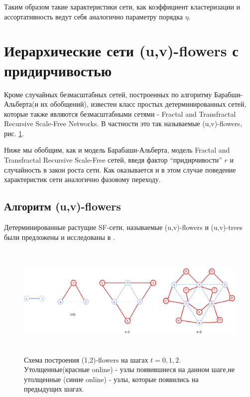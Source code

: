 \documentclass[10pt,aps,pra]{revtex4-1}
\begin{document}
        Таким образом такие характеристики сети, как коэффициент кластеризации и ассортативность ведут себя аналогично параметру порядка $\eta$.

\section{Иерархические сети (u,v)-flowers с придирчивостью}

    Кроме случайных безмасштабных сетей, построенных по алгоритму Барабши-Альберта(и их обобщений), известен класс простых детерминированных сетей, которые также являются безмасштабными сетями \cite{Rozenfeld2} - Fractal and Transfractal Recursive Scale-Free Networks. В частности это так называемые (u,v)-flowers, рис. \ref{fig:flowerGraph}.

    Ниже мы обобщим, как и модель Барабаши-Альберта, модель Fractal and Transfractal Recursive Scale-Free сетей, введя фактор ``придирчивости'' $r$ и случайность в закон роста сети. Как оказывается и в этом случае поведение характеристик сети аналогично фазовому переходу.

    \subsection{Алгоритм (u,v)-flowers}

        Детерминированные растущие SF-сети, называемые (u,v)-flowers и (u,v)-trees были предложены и исследованы в \cite{Dor1,Rozenfeld1,Rozenfeld2}.

            \begin{figure}[H]
                \centering
                \includegraphics[height=5.5cm]{graphics/hierarhical.png}
                \caption{
                \label{fig:flowerGraph}
                    Схема построения (1,2)-flowers на шагах $t=0,1,2$. Утолщенные(красные online) - узлы появившиеся на данном шаге,не утолщенные (синие online) - узлы, которые появились на предыдущих шагах.}
            \end{figure}
\end{document}
